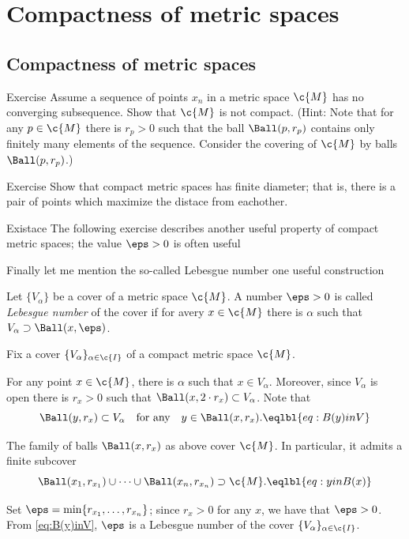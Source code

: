 \chapter{Compactness of metric spaces}

\section{Compactness of metric spaces}

\begin{thm}{Exercise}
Assume a sequence of points $x_n$ in a metric space $\c{M}$ has no converging subsequence.
Show that $\c{M}$ is not compact.
(Hint: Note that for any $p\in \c{M}$ there is $r_p>0$ such that the ball $\Ball(p,r_p)$ contains only finitely many elements of the sequence. Consider the covering of $\c{M}$ by balls $\Ball(p,r_p)$.)
\end{thm}


\begin{thm}{Exercise}
Show that compact metric spaces has finite diameter;
that is, there is a pair of points which maximize the distace from eachother.
\end{thm}


Existace 
The following exercise describes another useful property of compact metric spaces;
the value $\eps>0$ is often useful 

Finally let me mention the so-called Lebesgue number one useful construction

Let $\{V_\alpha\}$ be a cover of a metric space $\c{M}$.
A number $\eps > 0$ is called \emph{Lebesgue number} of the cover if for avery $x\in\c{M}$ there is $\alpha$ such that $ V_\alpha\supset \Ball(x,\eps)$.



Fix a cover $\{V_\alpha\}_{\alpha\in\c{I}}$ of a compact metric space $\c{M}$.

For any point $x\in \c{M}$, there is $\alpha$ such that $x\in V_\alpha$.
Moreover, since $V_\alpha$ is open there is $r_x>0$ such that 
$\Ball(x,2\cdot r_x)\subset V_\alpha$.
Note that 
\[\Ball(y,r_x)\subset V_\alpha\quad\text{for any}\quad y\in \Ball(x,r_x).
\eqlbl{eq:B(y)inV}\] 

The family of balls $\Ball(x,r_x)$ as above cover $\c{M}$.
In particular, it admits a finite subcover
\[\Ball(x_1,r_{x_1})\cup\dots\cup \Ball(x_n,r_{x_n})\supset \c{M}.\eqlbl{eq:yinB(x)}\]

Set $\eps=\min\{r_{x_1},\dots,r_{x_n}\}$;
since $r_x>0$ for any $x$, we have that $\eps>0$.
From \ref{eq:B(y)inV}, $\eps$ is a Lebesgue number of the cover $\{V_\alpha\}_{\alpha\in\c{I}}$.
\qeds


